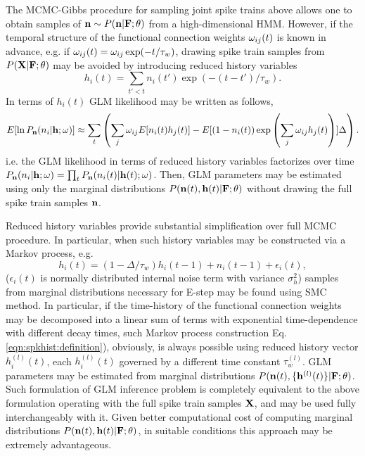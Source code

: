 The MCMC-Gibbs procedure for sampling joint spike trains above allows one to obtain samples of ${\bf n}\sim P({\bf n}|{\bf F}; \mathbf{\theta})$ from a high-dimensional HMM. However, if the temporal structure of the functional connection weights $\omega_{ij}(t)$ is known in advance, e.g. if $\omega_{ij}(t)=\omega_{ij}\exp(-t/\tau_w)$, drawing spike train samples from $P({\bf X}|{\bf F};\mathbf{\theta})$ may be avoided by introducing reduced history variables 
\begin{equation}
h_i(t)=\sum\limits_{t'<t} n_i(t')\exp(-(t-t')/\tau_w).
\end{equation}
In terms of $h_i(t)$ GLM likelihood may be written as follows, 
\begin{equation}
E[\ln P_{{\bf n}}(n_i|{\bf h}; \mathbf{\omega})]\approx \sum_t \left(\sum\limits_{j} \omega_{ij} E[n_i(t) h_j(t)] -
E[(1-n_i(t)) \exp\left(\sum\limits_j \omega_{ij}h_j(t)\right)] \Delta \right). 
\end{equation}
i.e. the GLM likelihood in terms of reduced history variables factorizes over time $P_{{\bf n}}(n_i|{\bf h};\mathbf{\omega})=\prod_t P_{{\bf n}}(n_i(t)|{\bf h}(t);\mathbf{\omega})$.
Then, GLM parameters may be estimated using only the marginal distributions $P({\bf n}(t), {\bf h}(t)|{\bf F};\mathbf{\theta})$ without drawing the full spike train samples ${\bf n}$.

Reduced history variables provide substantial simplification over full MCMC procedure. In particular, when such history variables may be constructed via a Markov process, e.g.
\begin{equation}\label{eqn:spkhist:definition}
h_i(t)=(1-\Delta/\tau_w) h_i(t-1) + n_i(t-1) + \epsilon_i(t), 
\end{equation}
($\epsilon_i(t)$ is normally distributed internal noise term with variance $\sigma^2_h$) samples from marginal distributions necessary for E-step may be found using SMC method. In particular, if the time-history of the  functional connection weights may be decomposed into a linear sum of  terms with exponential time-dependence with different decay times, such Markov process construction Eq. \eqref{eqn:spkhist:definition}), obviously, is always possible using reduced history vector $h_i^{(l)}(t)$, each $h_i^{(l)}(t)$ governed by a different time constant $\tau^{(l)}_w$. GLM parameters may be estimated from marginal distributions $P({\bf n}(t), \{{\bf h}^{(l)}(t)\}|{\bf F};\mathbf{\theta})$.  Such formulation of GLM inference problem is completely equivalent to the above formulation operating with the full spike train samples ${\bf X}$, and may be used fully interchangeably with it. Given better computational cost of computing marginal distributions $P({\bf n}(t), {\bf h}(t)|{\bf F};\mathbf{\theta})$, in suitable conditions this approach may be extremely advantageous. 

